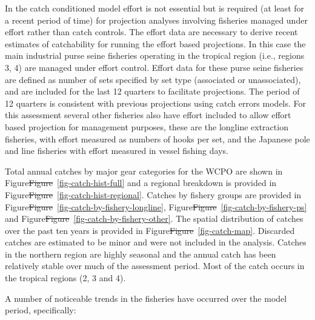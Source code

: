 \documentclass[
  english,
  a4paper,
  a4paper,
  11pt]{SCreport}
\providecommand{\DIFdel}[1]{{\protect\color{red}\sout{#1}}}                      %
\providecommand{\DIFdelbegin}{} %
\providecommand{\DIFdelend}{} %
\newcommand{\DIFscaledelfig}{0.5}
\newlength{\DIFdelgraphicswidth} %
\newlength{\DIFdelgraphicsheight} %
\newcommand{\DIFdelincludegraphics}[2][]{%
\sbox{\DIFdelgraphicsbox}{\DIFOincludegraphics[#1]{#2}}%
\settoboxwidth{\DIFdelgraphicswidth}{\DIFdelgraphicsbox} %
\settoboxtotalheight{\DIFdelgraphicsheight}{\DIFdelgraphicsbox} %
\scalebox{\DIFscaledelfig}{%
\parbox[b]{\DIFdelgraphicswidth}{\usebox{\DIFdelgraphicsbox}\\[-\baselineskip] \rule{\DIFdelgraphicswidth}{0em}}\llap{\resizebox{\DIFdelgraphicswidth}{\DIFdelgraphicsheight}{%
\setlength{\unitlength}{\DIFdelgraphicswidth}%
\begin{picture}(1,1)%
\thicklines\linethickness{2pt} %
{\color[rgb]{1,0,0}\put(0,0){\framebox(1,1){}}}%
{\color[rgb]{1,0,0}\put(0,0){\line( 1,1){1}}}%
{\color[rgb]{1,0,0}\put(0,1){\line(1,-1){1}}}%
\end{picture}%
}\hspace*{3pt}}} %
} %
\DeclareRobustCommand{\DIFdelbegin}{\DIFOdelbegin \let\includegraphics\DIFdelincludegraphics} %
\DeclareRobustCommand{\DIFdelend}{\DIFOaddend \let\includegraphics\DIFOincludegraphics} %
\begin{document}
In the catch conditioned model effort is not essential but is required
(at least for a recent period of time) for projection analyses involving
fisheries managed under effort rather than catch controls. The effort
data are necessary to derive recent estimates of catchability for
running the effort based projections. In this case the main industrial
purse seine fisheries operating in the tropical region (i.e., regions 3,
4) are managed under effort control. Effort data for these purse seine
fisheries are defined as number of sets specified by set type
(associated or unassociated), and are included for the last 12 quarters
to facilitate projections. The period of 12 quarters is consistent with
previous projections using catch errors models. For this assessment
several other fisheries also have effort included to allow effort based
projection for management purposes, these are the longline extraction
fisheries, with effort measured as numbers of hooks per set, and the
Japanese pole and line fisheries with effort measured in vessel fishing
days.

Total annual catches by major gear categories for the WCPO are shown in
Figure\DIFdelbegin \DIFdel{Figure}\DIFdelend ~\ref{fig-catch-hist-full} and a regional breakdown is provided in
Figure\DIFdelbegin \DIFdel{Figure}\DIFdelend ~\ref{fig-catch-hist-regional}. Catches by fishery groups are
provided in Figure\DIFdelbegin \DIFdel{Figure}\DIFdelend ~\ref{fig-catch-by-fishery-longline},
Figure\DIFdelbegin \DIFdel{Figure}\DIFdelend ~\ref{fig-catch-by-fishery-ps} and
Figure\DIFdelbegin \DIFdel{Figure}\DIFdelend ~\ref{fig-catch-by-fishery-other}. The spatial distribution of
catches over the past ten years is provided in
Figure\DIFdelbegin \DIFdel{Figure}\DIFdelend ~\ref{fig-catch-map}. Discarded catches are estimated to be minor
and were not included in the analysis. Catches in the northern region
are highly seasonal and the annual catch has been relatively stable over
much of the assessment period. Most of the catch occurs in the tropical
regions (2, 3 and 4).

A number of noticeable trends in the fisheries have occurred over the
model period, specifically:
\end{document}
